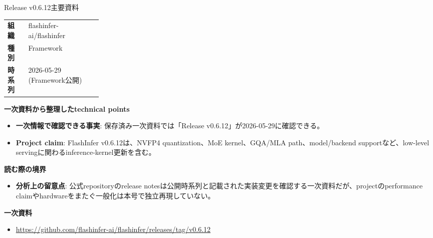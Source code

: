 \begin{technicalnote}{Release v0.6.12}{主要資料}
\begingroup
\begin{tabularx}{\linewidth}{@{}>{\bfseries}p{0.22\linewidth}X@{}}
組織 & flashinfer-ai/flashinfer \\
種別 & Framework \\
時系列 & 2026-05-29 (Framework公開) \\
\end{tabularx}
\smallskip
{\bfseries 一次資料から整理したtechnical points}
\begin{itemize}[leftmargin=1.5em,itemsep=0.35em]
\item \textbf{一次情報で確認できる事実}: 保存済み一次資料では「Release v0.6.12」が2026-05-29に確認できる。
\end{itemize}
\begin{minipage}{\linewidth}
\begin{itemize}[leftmargin=1.5em,itemsep=0.35em]
\item \textbf{Project claim}: FlashInfer v0.6.12は、NVFP4 quantization、MoE kernel、GQA/MLA path、model/backend supportなど、low-level servingに関わるinference-kernel更新を含む。
\end{itemize}
{\bfseries 読む際の境界}
\begin{itemize}[leftmargin=1.5em,itemsep=0.35em]
\item \textbf{分析上の留意点}: 公式repositoryのrelease notesは公開時系列と記載された実装変更を確認する一次資料だが、projectのperformance claimやhardwareをまたぐ一般化は本号で独立再現していない。
\end{itemize}
\begin{samepage}
{\bfseries 一次資料}
\begingroup\sloppy
\begin{itemize}[leftmargin=1.5em,itemsep=0.25em]
\item {\scriptsize\url{https://github.com/flashinfer-ai/flashinfer/releases/tag/v0.6.12}}
\end{itemize}
\endgroup
\end{samepage}
\end{minipage}
\endgroup
\end{technicalnote}
\medskip

